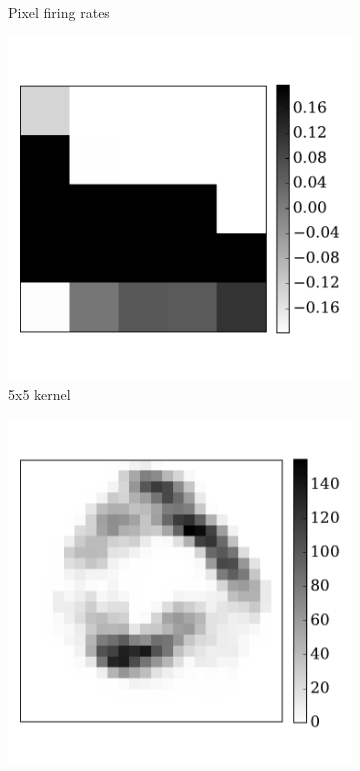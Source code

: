 \begin{figure}[tbh!]
\begin{subfigure}[t]{0.3\textwidth}
			\caption{Pixel firing rates}
			\label{Fig:62}
		\end{subfigure}
		\begin{subfigure}[t]{0.3\textwidth}
			\includegraphics[width=\textwidth]{pics_iconip/6-3.pdf}
			\caption{5x5 kernel}
			\label{Fig:63}
		\end{subfigure}
		\begin{subfigure}[t]{0.3\textwidth}
			\includegraphics[width=\textwidth]{pics_iconip/6-4.pdf}

\end{subfigure}
\end{figure}
